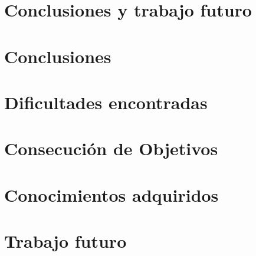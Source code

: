 \documentclass[../pfc.tex]{subfiles}
\begin{document}
	
	\section{Conclusiones y trabajo futuro}
	
	\section{Conclusiones}
	
	\section{Dificultades encontradas}
	
	\section{Consecución de Objetivos}
	
	\section{Conocimientos adquiridos}
	
	\section{Trabajo futuro}
	
\end{document}
